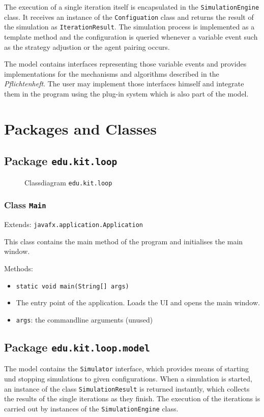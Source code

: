 \documentclass[parskip=full,11pt]{scrartcl}
\begin{document}
The execution of a single iteration itself is encapsulated in the \texttt{SimulationEngine} class. It receives an instance of the \texttt{Configuation} class and returns the result of the simulation as \texttt{IterationResult}. The simulation process is implemented as a template method and the configuration is queried whenever a variable event such as the strategy adjustion or the agent pairing occurs.

The model contains interfaces representing those variable events and provides implementations for the mechanisms and algorithms described in the \textit{Pflichtenheft}. The user may implement those interfaces himself and integrate them in the program using the plug-in system which is also part of the model.

\section{Packages and Classes}

\subsection{Package \texttt{edu.kit.loop}}
\iftrue
\begin{figure}[h]
	\centering
	\fontsize{9}{8}\selectfont
	

	\caption{Classdiagram \texttt{edu.kit.loop}}
\end{figure}
\fi
\subsubsection{Class \texttt{Main}}
Extends: \texttt{javafx.application.Application}

This class contains the main method of the program and initialises the main window.

Methods:
\begin{itemize}\itemsep -10pt
\item \texttt{static void main(String[] args)}
\item[] The entry point of the application. Loads the UI and opens the main window.
\item[] \texttt{args}: the commandline arguments (unused)
\end{itemize}
\newpage
\subsection{Package \texttt{edu.kit.loop.model}}
The model contains the \texttt{Simulator} interface, which provides means of starting und stopping simulations to given configurations. When a simulation is started, an instance of the class \texttt{SimulationResult} is returned instantly, which collects the results of the single iterations as they finish. The execution of the iterations is carried out by instances of the \texttt{SimulationEngine} class.
\end{document}
